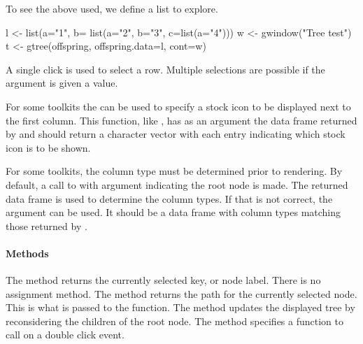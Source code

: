 To see the above used, we define a list to explore.
\begin{Schunk}
\begin{Sinput}
 l <- list(a="1", b= list(a="2", b="3", c=list(a="4")))
 w <- gwindow("Tree test")
 t <- gtree(offspring, offspring.data=l, cont=w)
\end{Sinput}
\end{Schunk}


A single click is used to select a row. Multiple selections are
possible if the  argument is given a
 value.

For some toolkits the  can be used to
specify a stock icon to be displayed next to the first column. This
function, like , has as an argument the data frame
returned by  and should return a character vector with
each entry indicating which stock icon is to be shown.

For some toolkits, the column type must be determined prior to
rendering. By default, a call to  with argument
 indicating the root node is made. The returned data frame
is used to determine the column types. If that is not correct, the
argument  can be used. It should be a data
frame with column types matching those returned by .

\paragraph{Methods}
The  method returns the currently selected key,
or node label. There is no assignment method. The \method{[}{gtree}
method returns the path for the currently selected node. This is what
is passed to the  function.  The
 method updates the displayed tree by
reconsidering the children of the root node.  The method
 specifies a function to call on
a double click event.

